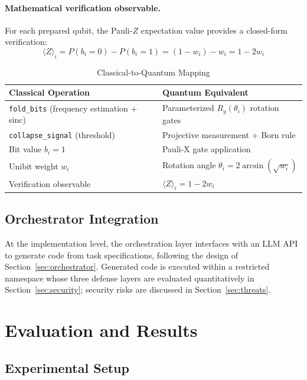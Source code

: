﻿\documentclass[12pt,a4paper]{article}
\begin{document}
\paragraph{Mathematical verification observable.} For each prepared qubit, the Pauli-$Z$ expectation value provides a closed-form verification:
\begin{equation}
    \langle Z \rangle_i = P(b_i = 0) - P(b_i = 1) = (1 - w_i) - w_i = 1 - 2w_i
\end{equation}

\begin{table}[H]
\centering
\caption{Classical-to-Quantum Mapping}
\label{tab:mapping}
\small
\begin{tabular}{@{}ll@{}}
\hline
\textbf{Classical Operation} & \textbf{Quantum Equivalent} \\
\hline
\texttt{fold\_bits} (frequency estimation + sinc) & Parameterized $R_y(\theta_i)$ rotation gates \\
\texttt{collapse\_signal} (threshold) & Projective measurement + Born rule \\
Bit value $b_i = 1$ & Pauli-X gate application \\
Unibit weight $w_i$ & Rotation angle $\theta_i = 2\arcsin(\sqrt{w_i})$ \\
Verification observable & $\langle Z \rangle_i = 1 - 2w_i$ \\
\hline
\end{tabular}
\end{table}

\subsection{Orchestrator Integration}

At the implementation level, the orchestration layer interfaces with an LLM API to generate code from task specifications, following the design of Section~\ref{sec:orchestrator}. Generated code is executed within a restricted namespace whose three defense layers are evaluated quantitatively in Section~\ref{sec:security}; security risks are discussed in Section~\ref{sec:threats}.


\section{Evaluation and Results}\label{sec:evaluation}

\subsection{Experimental Setup}
\end{document}
